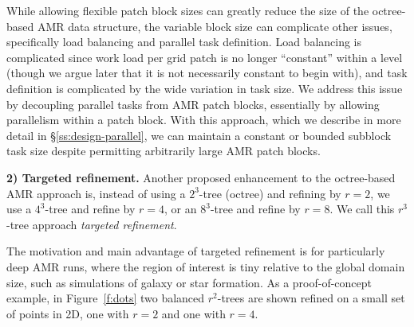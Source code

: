 \documentclass[10pt,twocolumn]{article}
\begin{document}

While allowing flexible patch block sizes can greatly reduce the size
of the octree-based AMR data structure, the variable block size can
complicate other issues, specifically load balancing and parallel task
definition.  Load balancing is complicated since work load per grid
patch is no longer ``constant'' within a level (though we argue later
that it is not necessarily constant to begin with), and task
definition is complicated by the wide variation in task size.  We
address this issue by decoupling parallel tasks from AMR patch blocks,
essentially by allowing parallelism within a patch block.  With this
approach, which we describe in more detail in
\S\ref{ss:design-parallel}, we can maintain a constant or bounded
subblock task size despite permitting arbitrarily large AMR patch
blocks.



\textbf{2) Targeted refinement.}  Another proposed enhancement to the
octree-based AMR approach is, instead of using a $2^3$-tree (octree)
and refining by $r=2$, we use a $4^3$-tree and refine by $r=4$, or an
$8^3$-tree and refine by $r=8$.  We call this $r^3$-tree approach
\textit{targeted refinement}.

The motivation and main advantage of targeted refinement is for
particularly deep AMR runs, where the region of interest is tiny
relative to the global domain size, such as simulations of galaxy or
star formation.  As a proof-of-concept example, in Figure~\ref{f:dots}
two balanced $r^2$-trees are shown refined on a small set of points in 2D, one
with $r=2$ and one with $r=4$.
\end{document}
